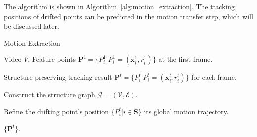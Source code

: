 The algorithm is shown in Algorithm~\ref{alg:motion_extraction}. The tracking positions of drifted points can be predicted in the motion transfer step, which will be discussed later. 

\begin{algorithm}
	\caption{Motion Extraction}\label{euclid}
	\label{alg:motion_extraction}
	
	\begin{algorithmic}[1]
		\Require Video $ V $, Feature points $ \mathbf{P}^1 = \{P^1_i | P^1_i = (\mathbf{x}^1_i, r^1_i)\} $ at the first frame.
		
		\Ensure Structure preserving tracking result $ \mathbf{P}^t = \{P^t_i | P^t_i = (\mathbf{x}^t_i, r^t_i)\} $ for each frame.
		
		\State Construct the structure graph $ \mathcal{G} = (\mathcal{V}, \mathcal{E}) $.
		
		
		
		\EndFor
		
		\State Refine the drifting point's position $ \{ P^t_i | i \in \mathbf{S}\} $ its global motion trajectory.
		
		\State \Return $ \{\mathbf{P}^t\} $.
		
	\end{algorithmic}
\end{algorithm}

